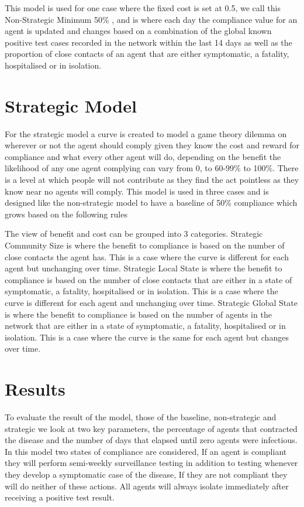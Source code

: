 \documentclass{article}
\begin{document}
This model is used for one case where the fixed cost is set at 0.5, we call this Non-Strategic Minimum 50\% , and is where each day the compliance value for an agent is updated and changes based on a combination of the global known positive test cases recorded in the network within the last 14 days as well as the proportion of close contacts of an agent that are either symptomatic, a fatality, hospitalised or in isolation.\newline


\section{Strategic Model}
For the strategic model a curve is created to model a game theory dilemma on wherever or not the agent should comply given they know the cost and reward for compliance and what every other agent will do, depending on the benefit the likelihood of any one agent complying can vary from 0, to 60-99\% to 100\%. There is a level at which people will not contribute as they find the act pointless as they know near no agents will comply. This model is used in three cases and is designed like the non-strategic model to have a baseline of 50\% compliance which grows based on the following rules\newline

The view of benefit and cost can be grouped into 3 categories. Strategic Community Size is where the benefit to compliance is based on the number of close contacts the agent has. This is a case where the curve is different for each agent but unchanging over time. Strategic Local State is where the benefit to compliance is based on the number of close contacts that are either in a state of symptomatic, a fatality, hospitalised or in isolation. This is a case where the curve is different for each agent and unchanging over time. Strategic Global State is where the benefit to compliance is based on the number of agents in the network that are either in a state of symptomatic, a fatality, hospitalised or in isolation. This is a case where the curve is the same for each agent but changes over time.

\section{Results}

To evaluate the result of the model, those of the baseline, non-strategic and strategic we look at two key parameters, the percentage of agents that contracted the disease and the number of days that elapsed until zero agents were infectious. In this model two states of compliance are considered, If an agent is compliant they will perform semi-weekly surveillance testing in addition to testing whenever they develop a symptomatic case of the disease, If they are not compliant they will do neither of these actions. All agents will always isolate immediately after receiving a positive test result. \newline
\end{document}
